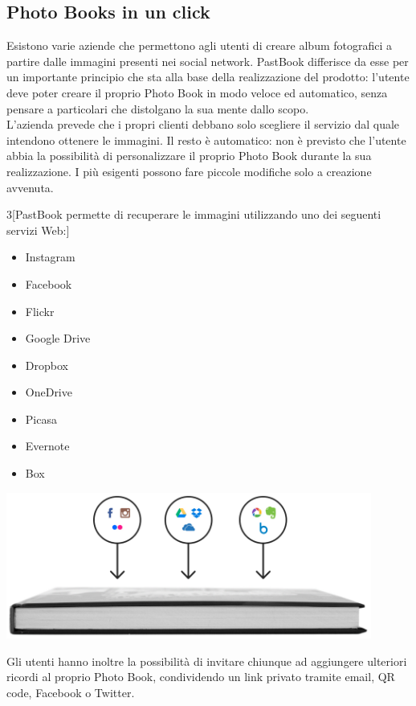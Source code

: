 		\subsection{Photo Books in un click}
			Esistono varie aziende che permettono agli utenti di creare album fotografici a partire dalle immagini presenti nei social
			network. PastBook differisce da esse per un importante principio che sta alla base della realizzazione del prodotto: l'utente
			deve poter creare il proprio Photo Book in modo veloce ed automatico, senza pensare a particolari che distolgano la sua mente
			dallo scopo.\\
			L'azienda prevede che i propri clienti debbano solo scegliere il servizio dal quale intendono ottenere le immagini. Il resto
			è automatico: non è previsto che l'utente abbia la possibilità di personalizzare il proprio Photo Book durante la sua
			realizzazione. I più esigenti possono fare piccole modifiche solo a creazione avvenuta.\\
			\begin{multicols}{3}[\noindent PastBook permette di recuperare le immagini utilizzando uno dei seguenti servizi Web:]
				\begin{itemize}
					\item Instagram
					\item Facebook
					\item Flickr
					\item Google Drive
					\item Dropbox
					\item OneDrive
					\item Picasa
					\item Evernote
					\item Box
				\end{itemize}
			\end{multicols}
			\begin{center}
				\includegraphics[width=0.9\textwidth]{capitolo_1/immagini/photo_book_one_click.png}
			\end{center}
			Gli utenti hanno inoltre la possibilità di invitare chiunque ad aggiungere ulteriori ricordi al proprio Photo Book,
			condividendo un link privato tramite email, QR code, Facebook o Twitter.
